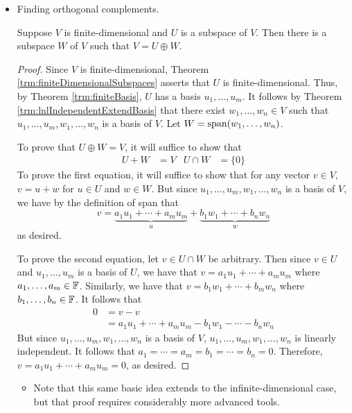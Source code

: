 \documentclass[../main.tex]{subfiles}
\begin{document}
\begin{itemize}
\begin{theorem}
\begin{proof}
        \end{proof}
    \end{theorem}
    \item Finding orthogonal complements.
    \begin{theorem}
        Suppose $V$ is finite-dimensional and $U$ is a subspace of $V$. Then there is a subspace $W$ of $V$ such that $V=U\oplus W$.
        \begin{proof}
            Since $V$ is finite-dimensional, Theorem \ref{trm:finiteDimensionalSubspaces} asserts that $U$ is finite-dimensional. Thus, by Theorem \ref{trm:finiteBasis}, $U$ has a basis $u_1,\dots,u_m$. It follows by Theorem \ref{trm:lnlIndependentExtendBasis} that there exist $w_1,\dots,w_n\in V$ such that $u_1,\dots,u_m,w_1,\dots,w_n$ is a basis of $V$. Let $W=\operatorname{span}(w_1,\dots,w_n)$.\par
            To prove that $U\oplus W=V$, it will suffice to show that
            \begin{align*}
                U+W &= V&
                U\cap W &= \{0\}
            \end{align*}
            To prove the first equation, it will suffice to show that for any vector $v\in V$, $v=u+w$ for $u\in U$ and $w\in W$. But since $u_1,\dots,u_m,w_1,\dots,w_n$ is a basis of $V$, we have by the definition of span that
            \begin{equation*}
                v = \underbrace{a_1u_1+\cdots+a_mu_m}_u+\underbrace{b_1w_1+\cdots+b_nw_n}_w
            \end{equation*}
            as desired.\par
            To prove the second equation, let $v\in U\cap W$ be arbitrary. Then since $v\in U$ and $u_1,\dots,u_m$ is a basis of $U$, we have that $v=a_1u_1+\cdots+a_mu_m$ where $a_1,\dots,a_m\in\mathbb{F}$. Similarly, we have that $v=b_1w_1+\cdots+b_mw_n$ where $b_1,\dots,b_n\in\mathbb{F}$. It follows that
            \begin{align*}
                0 &= v-v\\
                &= a_1u_1+\cdots+a_mu_m-b_1w_1-\cdots-b_nw_n
            \end{align*}
            But since $u_1,\dots,u_m,w_1,\dots,w_n$ is a basis of $V$, $u_1,\dots,u_m,w_1,\dots,w_n$ is linearly independent. It follows that $a_1=\cdots=a_m=b_1=\cdots=b_n=0$. Therefore, $v=a_1u_1+\cdots+a_mu_m=0$, as desired.
        \end{proof}
    \end{theorem}
    \begin{itemize}
        \item Note that this same basic idea extends to the infinite-dimensional case, but that proof requires considerably more advanced tools.
    \end{itemize}
\end{itemize}
\end{document}
